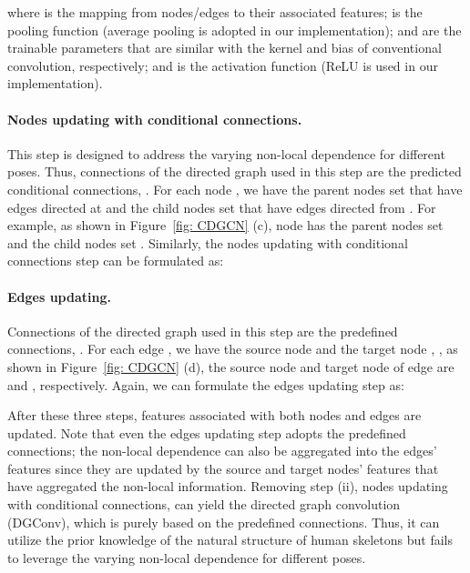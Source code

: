 \documentclass[sigconf]{acmart}
\begin{document}
where  is the mapping from nodes/edges to their associated features;  is the pooling function (average pooling is adopted in our implementation);  and  are the trainable parameters that are similar with the kernel and bias of conventional convolution, respectively; and  is the activation function (ReLU is used in our implementation).


\vspace{-2mm}
\paragraph{Nodes updating with conditional connections.}
This step is designed to address the varying non-local dependence for different poses.
Thus, connections of the directed graph used in this step are the predicted conditional connections, .
For each node , we have the parent nodes set  that have edges directed at  and the child nodes set  that have edges directed from .
For example, as shown in Figure~\ref{fig: CDGCN} (c), node  has the parent nodes set  and the child nodes set .
Similarly, the nodes updating with conditional connections step can be formulated as:



\vspace{-4mm}
\paragraph{Edges updating.}
Connections of the directed graph used in this step are the predefined connections, .
For each edge , we have the source node  and the target node , \eg, as shown in Figure~\ref{fig: CDGCN} (d), the source node and target node of edge  are  and , respectively.
Again, we can formulate the edges updating step as:



\vspace{-2mm}
After these three steps, features associated with both nodes and edges are updated.
Note that even the edges updating step adopts the predefined connections; the non-local dependence can also be aggregated into the edges' features since they are updated by the source and target nodes' features that have aggregated the non-local information.
Removing step (ii), nodes updating with conditional connections, can yield the directed graph convolution (DGConv), which is purely based on the predefined connections.
Thus, it can utilize the prior knowledge of the natural structure of human skeletons but fails to leverage the varying non-local dependence for different poses. 
\end{document}
